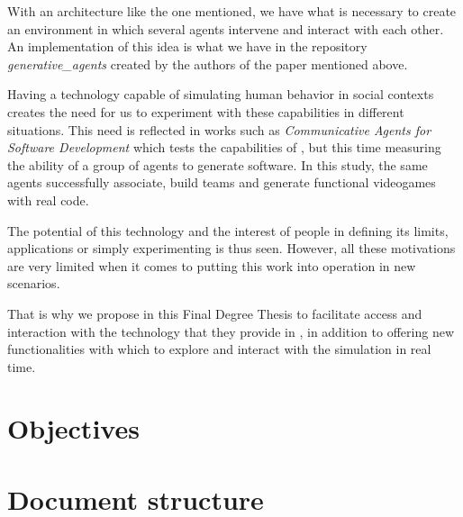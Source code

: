 With an architecture like the one mentioned, we have what is necessary to create an environment in which several agents intervene and interact with each other. An implementation of this idea is what we have in the repository \textit{generative\_agents} created by the authors of the paper mentioned above.

Having a technology capable of simulating human behavior in social contexts creates the need for us to experiment with these capabilities in different situations. This need is reflected in works such as \textit{Communicative Agents for Software Development} which tests the capabilities of \ga, but this time measuring the ability of a group of agents to generate software. In this study, the same agents successfully associate, build teams and generate functional videogames with real code.

The potential of this technology and the interest of people in defining its limits, applications or simply experimenting is thus seen. However, all these motivations are very limited when it comes to putting this work into operation in new scenarios.

That is why we propose in this Final Degree Thesis to facilitate access and interaction with the technology that they provide in \ga, in addition to offering new functionalities with which to explore and interact with the simulation in real time.

\section{Objectives}

\section{Document structure}







